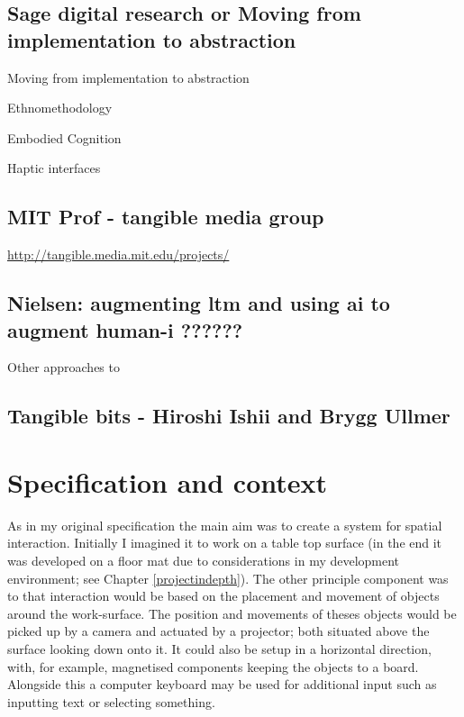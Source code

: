 \documentclass[12pt]{report}
\begin{document}
\section{Sage digital research or Moving from implementation to abstraction}
\label{sec:orgaf13c1d}

Moving from implementation to abstraction

Ethnomethodology

Embodied Cognition

Haptic interfaces

\section{MIT Prof - tangible media group}
\label{sec:org23ad866}
\url{http://tangible.media.mit.edu/projects/}
\section{Nielsen: augmenting ltm and using ai to augment human-i ??????}
\label{sec:org8d8f366}

Other approaches to 

\cite{NielsenMich2018altm}

\cite{carter2017using}  

\section{Tangible bits - Hiroshi Ishii  and  Brygg Ullmer}
\label{sec:org8c86586}
\cite{IshiiH2002Tbdt}

\chapter{Specification and context}
\label{sec:org33acc38}

As in my original specification the main aim was to create a system for spatial
interaction. Initially I imagined it to work on a table top surface (in the end
it was developed on a floor mat due to considerations in my development
environment; see Chapter \ref{projectindepth}). The other principle component was
to that interaction would be based on the placement and movement of objects
around the work-surface. The position and movements of theses objects would be
picked up by a camera and actuated by a projector; both situated above the
surface looking down onto it. It could also be setup in a horizontal direction,
with, for example, magnetised components keeping the objects to a board.
Alongside this a computer keyboard may be used for additional input such as
inputting text or selecting something. \\
\end{document}
